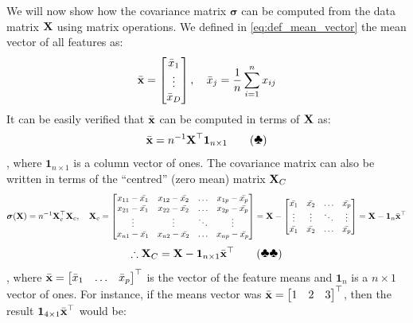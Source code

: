 \documentclass[a4paper]{article}
\begin{document}
We will now show how the covariance matrix $\boldsymbol{\sigma}$ can be computed from the data matrix $\textbf{X}$ using matrix operations. We defined in \eqref{eq:def_mean_vector} the mean vector of all features as:
\[
\bar{\textbf{x}} = \begin{bmatrix}\bar{x}_1 \\ \vdots \\ \bar{x}_D \end{bmatrix}, \quad
\bar{x}_j  = \frac{1}{n}\sum\limits_{i=1}^{n}x_{ij} 
\]
It can be easily verified that $\bar{\textbf{x}}$ can be computed in terms of $\textbf{X}$ as:
\begin{gather*}
    \bar{\bx} = n^{-1}\bX\t\textbf{1}_{n\times 1} \tag{\ding{168}}
    \label{eq:cov_proof_x_bar_wrt_x}
\end{gather*}
, where $\textbf{1}_{n\times 1}$ is a column vector of ones. The covariance matrix can also be written in terms of the ``centred'' (zero mean) matrix $\textbf{X}_C$
\[
\boldsymbol{\sigma}(\textbf{X}) = n^{-1}\textbf{X}_c^{\top}\textbf{X}_c, \quad \textbf{X}_c = 
\begin{bmatrix}
x_{11} - \bar{x_1} & x_{12} - \bar{x_2} & \ldots & x_{1p} - \bar{x_p}\\
x_{21} - \bar{x_1} & x_{22} - \bar{x_2} & \ldots & x_{2p} - \bar{x_p}\\
\vdots & \vdots & \ddots & \vdots \\
x_{n1} - \bar{x_1} & x_{n2} - \bar{x_2} & \ldots & x_{np} - \bar{x_p}\\
\end{bmatrix} = 
\textbf{X} - 
\begin{bmatrix}
\bar{x_1} & \bar{x_2} & \ldots & \bar{x_p} \\
\vdots & \vdots & \ddots & \vdots \\
\bar{x_1} & \bar{x_2} & \ldots & \bar{x_p} \\
\end{bmatrix} 
= \textbf{X} - \textbf{1}_{n}\bar{\textbf{x}}^{\top}
\]
\begin{gather*}
    \therefore \bX_C = \bX - \textbf{1}_{n\times 1}\bar{\bx}\t \tag{\ding{168}\ding{168}}
    \label{eq:cov_proof_cov_x_bar}
\end{gather*}
, where $\bar{\textbf{x}} = \begin{bmatrix}\bar{x}_1 & \ldots & \bar{x}_p \end{bmatrix}^{\top}$ is the vector of the feature means and $ \textbf{1}_{n}$ is a $n\times 1$ vector of ones. For instance, if the means vector was $\bar{\textbf{x}} = \begin{bmatrix}1 & 2 & 3 \end{bmatrix}^{\top}$, then the result $\textbf{1}_{4\times 1} \bar{\textbf{x}}^{\top}$ would be:
\end{document}
